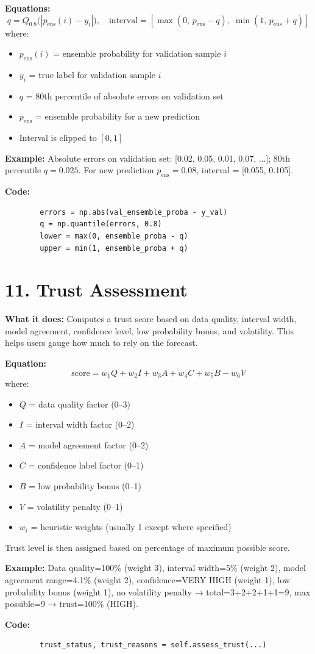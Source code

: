 \documentclass[12pt]{article}
\begin{document}
	\textbf{Equations:}
	\[
	q = Q_{0.8}\bigl(|p_{\text{ens}}(i)-y_i|\bigr),\quad
	\text{interval} = [\max(0,\,p_{\text{ens}}-q),\;\min(1,\,p_{\text{ens}}+q)]
	\]
	where:
	\begin{itemize}
		\item $p_{\text{ens}}(i)$ = ensemble probability for validation sample $i$
		\item $y_i$ = true label for validation sample $i$
		\item $q$ = 80th percentile of absolute errors on validation set
		\item $p_{\text{ens}}$ = ensemble probability for a new prediction
		\item Interval is clipped to $[0,1]$
	\end{itemize}
	
	\textbf{Example:} Absolute errors on validation set: [0.02, 0.05, 0.01, 0.07, ...]; 80th percentile $q=0.025$. For new prediction $p_{\text{ens}}=0.08$, interval = [0.055, 0.105].
	
	\textbf{Code:}
	\begin{lstlisting}
		errors = np.abs(val_ensemble_proba - y_val)
		q = np.quantile(errors, 0.8)
		lower = max(0, ensemble_proba - q)
		upper = min(1, ensemble_proba + q)
	\end{lstlisting}
	
	\section*{11. Trust Assessment}
	\textbf{What it does:} Computes a trust score based on data quality, interval width, model agreement, confidence level, low probability bonus, and volatility. This helps users gauge how much to rely on the forecast.
	
	\textbf{Equation:}
	\[
	\text{score} = w_1 Q + w_2 I + w_3 A + w_4 C + w_5 B - w_6 V
	\]
	where:
	\begin{itemize}
		\item $Q$ = data quality factor (0–3)
		\item $I$ = interval width factor (0–2)
		\item $A$ = model agreement factor (0–2)
		\item $C$ = confidence label factor (0–1)
		\item $B$ = low probability bonus (0–1)
		\item $V$ = volatility penalty (0–1)
		\item $w_i$ = heuristic weights (usually 1 except where specified)
	\end{itemize}
	Trust level is then assigned based on percentage of maximum possible score.
	
	\textbf{Example:} Data quality=100\% (weight 3), interval width=5\% (weight 2), model agreement range=4.1\% (weight 2), confidence=VERY HIGH (weight 1), low probability bonus (weight 1), no volatility penalty → total=3+2+2+1+1=9, max possible=9 → trust=100\% (HIGH).
	
	\textbf{Code:}
	\begin{lstlisting}
		trust_status, trust_reasons = self.assess_trust(...)
	\end{lstlisting}
	
\end{document}
